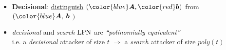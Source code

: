 \begin{frame}
\begin{itemize}[<+->]
 \end{itemize}
\vspace{5pt}

  \begin{itemize}
    \item<5-> \textbf{Decisional}: \underline{distinguish} $\left( {\color{blue}\vect{A}}, {\color{red}\vect{b}} \right)$ from {\color{blue}{uniform}} $( {\color{blue}\vect{A}}, $ {\color{blue} $\boldsymbol{b}$} $)$ 
\vspace{5pt}
    \item<6-> \emph{decisional} and \emph{search} $\mathrm{LPN}$ are \emph{``polinomially equivalent''} \\
    i.e. a \emph{decisional} attacker of size $t$ $\Rightarrow$ a \emph{search} attacker of size $poly(t)$ 
 \end{itemize}
\end{frame}

